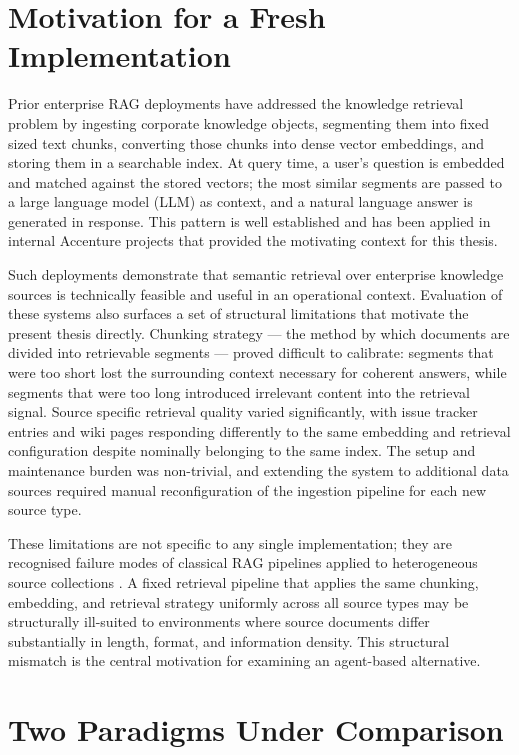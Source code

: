 \section{Motivation for a Fresh Implementation}

Prior enterprise RAG deployments have addressed the knowledge retrieval problem by ingesting corporate knowledge objects, segmenting them into fixed sized text chunks, converting those chunks into dense vector embeddings, and storing them in a searchable index. At query time, a user's question is embedded and matched against the stored vectors; the most similar segments are passed to a large language model (LLM) as context, and a natural language answer is generated in response. This pattern is well established and has been applied in internal Accenture projects that provided the motivating context for this thesis.

Such deployments demonstrate that semantic retrieval over enterprise knowledge sources is technically feasible and useful in an operational context. Evaluation of these systems also surfaces a set of structural limitations that motivate the present thesis directly. Chunking strategy — the method by which documents are divided into retrievable segments — proved difficult to calibrate: segments that were too short lost the surrounding context necessary for coherent answers, while segments that were too long introduced irrelevant content into the retrieval signal. Source specific retrieval quality varied significantly, with issue tracker entries and wiki pages responding differently to the same embedding and retrieval configuration despite nominally belonging to the same index. The setup and maintenance burden was non-trivial, and extending the system to additional data sources required manual reconfiguration of the ingestion pipeline for each new source type.

These limitations are not specific to any single implementation; they are recognised failure modes of classical RAG pipelines applied to heterogeneous source collections \cite{gao2023ragsurvey}. A fixed retrieval pipeline that applies the same chunking, embedding, and retrieval strategy uniformly across all source types may be structurally ill-suited to environments where source documents differ substantially in length, format, and information density. This structural mismatch is the central motivation for examining an agent-based alternative.


\section{Two Paradigms Under Comparison}

